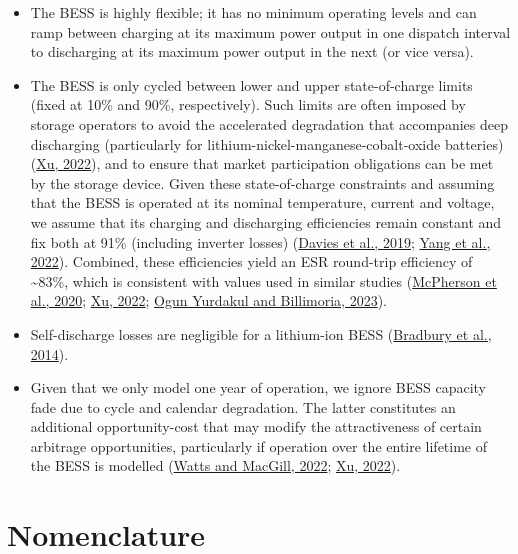 \documentclass[12pt,a4paper,]{report}
\providecommand{\tightlist}{%
  \setlength{\itemsep}{0pt}\setlength{\parskip}{0pt}}
\begin{document}
\begin{itemize}
\tightlist
\item
  The BESS is highly flexible; it has no minimum operating levels and
  can ramp between charging at its maximum power output in one dispatch
  interval to discharging at its maximum power output in the next (or
  vice versa).
\item
  The BESS is only cycled between lower and upper state-of-charge limits
  (fixed at 10\% and 90\%, respectively). Such limits are often imposed
  by storage operators to avoid the accelerated degradation that
  accompanies deep discharging (particularly for
  lithium-nickel-manganese-cobalt-oxide batteries)
  (\protect\hyperlink{ref-xuRoleModelingBattery2022}{Xu, 2022}), and to
  ensure that market participation obligations can be met by the storage
  device. Given these state-of-charge constraints and assuming that the
  BESS is operated at its nominal temperature, current and voltage, we
  assume that its charging and discharging efficiencies remain constant
  and fix both at 91\% (including inverter losses)
  (\protect\hyperlink{ref-daviesCombinedEconomicTechnological2019}{Davies
  et al., 2019};
  \protect\hyperlink{ref-yangModellingOptimalEnergy2022}{Yang et al.,
  2022}). Combined, these efficiencies yield an ESR round-trip
  efficiency of \textasciitilde83\%, which is consistent with values
  used in similar studies
  (\protect\hyperlink{ref-mcphersonImpactsStorageDispatch2020}{McPherson
  et al., 2020}; \protect\hyperlink{ref-xuRoleModelingBattery2022}{Xu,
  2022};
  \protect\hyperlink{ref-yurdakulRiskAverseSelfSchedulingStorage2023}{Ogun
  Yurdakul and Billimoria, 2023}).
\item
  Self-discharge losses are negligible for a lithium-ion BESS
  (\protect\hyperlink{ref-bradburyEconomicViabilityEnergy2014}{Bradbury
  et al., 2014}).
\item
  Given that we only model one year of operation, we ignore BESS
  capacity fade due to cycle and calendar degradation. The latter
  constitutes an additional opportunity-cost that may modify the
  attractiveness of certain arbitrage opportunities, particularly if
  operation over the entire lifetime of the BESS is modelled
  (\protect\hyperlink{ref-wattsEffectsBatteryDegradation2022}{Watts and
  MacGill, 2022}; \protect\hyperlink{ref-xuRoleModelingBattery2022}{Xu,
  2022}).
\end{itemize}

\hypertarget{nomenclature}{%
\section{Nomenclature}\label{nomenclature}}
\end{document}
